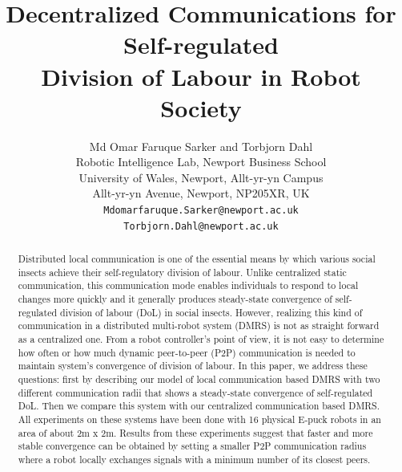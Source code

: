 \documentclass[letterpaper, 10 pt, conference]{ieeeconf}  %
\title{\LARGE \bf
Decentralized Communications for Self-regulated\\ Division of Labour in Robot Society
}
\author{ Md Omar Faruque Sarker and Torbjorn Dahl\\
        Robotic Intelligence Lab, Newport Business School\\
		University of Wales, Newport, Allt-yr-yn Campus\\ 
		Allt-yr-yn Avenue, Newport, NP205XR, UK\\
		{\tt\small Mdomarfaruque.Sarker@newport.ac.uk}\\ 
		{\tt\small Torbjorn.Dahl@newport.ac.uk}      
}
\begin{document}
\maketitle
\thispagestyle{empty}
\pagestyle{empty}


\begin{abstract}

Distributed local communication is one of the essential means by which various social insects achieve their self-regulatory division of labour. Unlike centralized static communication, this communication mode enables individuals to respond to local changes more quickly and it generally produces steady-state convergence of self-regulated division of labour (DoL) in social insects. However, realizing this kind of communication in a distributed multi-robot system (DMRS) is not as straight forward as a centralized one. From a robot controller's point of view, it is not easy to determine how often or how much dynamic peer-to-peer (P2P) communication  is needed to maintain system's convergence of division of labour. In this paper, we address these questions: first by describing our model of local communication based DMRS with two different communication radii that shows a steady-state convergence of self-regulated DoL. Then we compare this system with our centralized communication based DMRS. All experiments on these systems  have been done with 16 physical E-puck robots in an area of about 2m x 2m. Results from these experiments suggest that faster and more stable convergence can be obtained by setting a smaller P2P communication radius where a robot locally exchanges signals with a minimum number of its closest peers.

\end{abstract}


\end{document}

